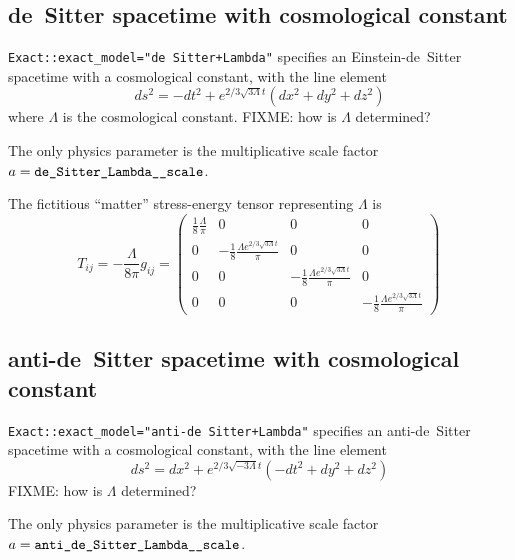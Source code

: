 
\subsection{de~Sitter spacetime with cosmological constant}

\verb|Exact::exact_model="de Sitter+Lambda"| specifies an Einstein-de~Sitter
spacetime with a cosmological constant, with the line element
\begin{equation}
ds^2 = - dt^2 + e^{2/3\sqrt{3\Lambda}t} \left ( dx^2 + dy^2 + dz^2 \right) 
\end{equation}
where $\Lambda$ is the cosmological constant.
FIXME: how is $\Lambda$ determined?

The only physics parameter is the multiplicative scale
factor $a = \verb|de_Sitter_Lambda__scale|$.

The fictitious ``matter'' stress-energy tensor representing $\Lambda$ is
\begin{equation}
T_{ij}= - \frac{\Lambda}{8 \pi} g_{ij} = \left ( \begin{array}{cccc}
\frac{1}{8}\frac{\Lambda}{\pi} & 0 & 0 & 0\\
0 & -\frac{1}{8}\frac{\Lambda  e^{2/3 \sqrt{3\Lambda}t}}{\pi }& 0 & 0\\
0 & 0 &-\frac{1}{8}\frac{\Lambda e^{2/3 \sqrt{3\Lambda}t}}{\pi }&  0\\
0 & 0 & 0 & -\frac{1}{8}\frac{\Lambda  e^{2/3 
\sqrt{3\Lambda}t}}{\pi}\end{array}\right ) \, 
\end{equation}


\subsection{anti-de~Sitter spacetime with cosmological constant}

\verb|Exact::exact_model="anti-de Sitter+Lambda"| specifies an
anti-de~Sitter spacetime with a cosmological constant, with the line
element
\begin{equation}
ds^2 =  dx^2 + e^{2/3\sqrt{-3\Lambda}t} \left ( -dt^2 + dy^2 + dz^2 \right)  
\end{equation}
FIXME: how is $\Lambda$ determined?

The only physics parameter is the multiplicative scale
factor $a = \verb|anti_de_Sitter_Lambda__scale|$.


